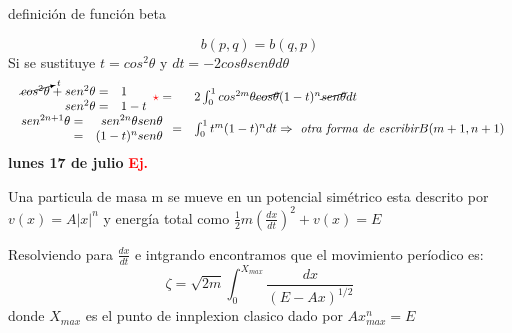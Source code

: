 \documentclass{article}
\theoremstyle{definition}
\begin{document}
\begin{center}
\fbox{\begin{minipage}{15em}
  \[b(p,q)=\frac{\Gamma (q)\Gamma (p)}{\Gamma (q+p)}\]
\end{minipage}} definición de función beta
\end{center}
\[b(p,q)=b(q,p)\]
Si se sustituye $t=cos^2\theta$ y $dt=-2cos\theta sen\theta d\theta$
\[
\begin{array}{ll}
	\begin{array}{rl}
		\cancelto{t}{cos^2\theta}+sen^2\theta=&1\\
		sen^2\theta =&1-t
	\end{array} \textcolor{red}{\star}= & 2\int^{1}_0 cos^{2m}\theta\cancel{cos\theta} (1-t)^n\cancel{sen\theta}dt\\
	\begin{array}{rr}
		sen^{2n+1}\theta=&sen^{2n}\theta sen\theta\\
		=&(1-t)^n sen\theta
	\end{array} = & \int^{1}_0 t^m (1-t)^n dt\Rightarrow \textit{ otra forma de escribir} B(m+1,n+1)
\end{array}
\]
\newpage
\textbf{lunes 17 de julio}
\textbf{\textcolor{red}{Ej.}}

Una particula de masa m se mueve en un potencial simétrico esta descrito por $v(x)=A|x|^n$ y energía total como $\frac{1}{2}m\left(\frac{dx}{dt}\right)^2 +v(x)=E$

Resolviendo para $\frac{dx}{dt}$ e intgrando encontramos que el movimiento períodico es:
\[\zeta=\sqrt{2m}\int^{X_{max}}_0 \frac{dx}{(E-Ax)^{1/2}}\]
donde $X_{max}$ es el punto de innplexion clasico dado por $Ax_{max}^n=E$
\end{document}
